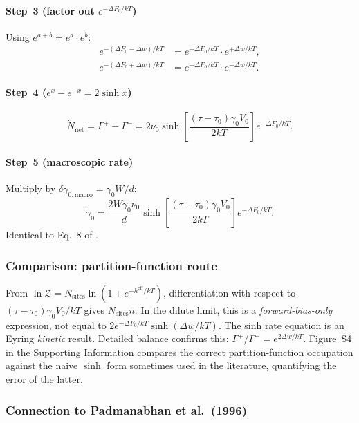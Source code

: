 \documentclass[3p]{elsarticle}
\newcommand{\dF}{\Delta F_0}
\newcommand{\gz}{\gamma_0}
\begin{document}
\paragraph{Step~3 (factor out $e^{-\dF/kT}$)}
Using $e^{a+b}=e^a\cdot e^b$:
\begin{align*}
  e^{-(\dF-\Delta w)/kT}&=e^{-\dF/kT}\cdot e^{+\Delta w/kT},\\
  e^{-(\dF+\Delta w)/kT}&=e^{-\dF/kT}\cdot e^{-\Delta w/kT}.
\end{align*}

\paragraph{Step~4 ($e^x-e^{-x}=2\sinh x$)}
\begin{equation}
  \dot N_\text{net}=\Gamma^+-\Gamma^-
  =2\nu_0\sinh\!\left[\frac{(\tau-\tau_0)\gz V_0}{2kT}\right]
  e^{-\dF/kT}.
  \label{eq:Nnet}
\end{equation}

\paragraph{Step~5 (macroscopic rate)}
Multiply by $\delta\gamma_{0,\text{macro}}=\gz W/d$:
\begin{equation}
  \boxed{\dot\gz=\frac{2W\gz\nu_0}{d}
  \sinh\!\left[\frac{(\tau-\tau_0)\gz V_0}{2kT}\right]
  e^{-\dF/kT}.}
  \label{eq:rate}
\end{equation}
Identical to Eq.~8 of \citet{pad-part1}.

\subsubsection{Comparison: partition-function route}

From $\ln\mathcal Z=N_\text{sites}\ln(1+e^{-h^\text{eff}/kT})$,
differentiation with respect to $(\tau-\tau_0)\gz V_0/kT$ gives
$N_\text{sites}\bar n$. In the dilute limit, this is a
\emph{forward-bias-only} expression, not equal to $2e^{-\dF/kT}
\sinh(\Delta w/kT)$.
The sinh rate equation is an Eyring \emph{kinetic} result.
Detailed balance confirms this: $\Gamma^+/\Gamma^-=e^{2\Delta w/kT}$.
Figure~S4 in the Supporting Information compares the correct
partition-function occupation against the naive $\sinh$ form
sometimes used in the literature, quantifying the error of the
latter.

\subsubsection{Connection to Padmanabhan et al.\ (1996)}
\end{document}
